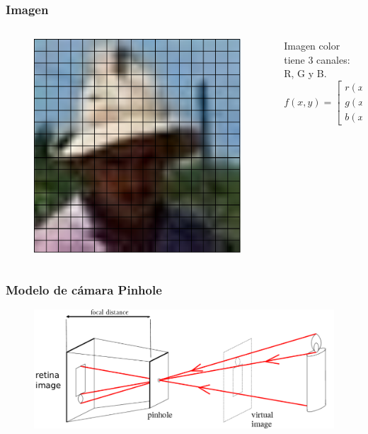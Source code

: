 \begin{frame}
    \frametitle{Imagen}
    
    
    \begin{columns}
    	\begin{column}{0.5\textwidth}
		    \begin{figure}[!h]
			\includegraphics[width=0.6\columnwidth]{images/image_pixels.pdf}
			\end{figure}
    	\end{column}
    	\begin{column}{0.3\textwidth}
		Imagen color tiene 3 canales: R, G y B.
		\begin{equation*}
			f(x,y)=
			\begin{bmatrix}
				r(x,y) \\
				g(x,y) \\
				b(x,y)
			\end{bmatrix}
		\end{equation*}
    	\end{column}
    \end{columns}
\end{frame}

\begin{frame}
	\frametitle{Modelo de cámara Pinhole}
	
	\begin{figure}[!h]
		\includegraphics[width=0.6\columnwidth]{images/pinhole_camera_virtual_image.pdf}
	\end{figure}

\end{frame}

